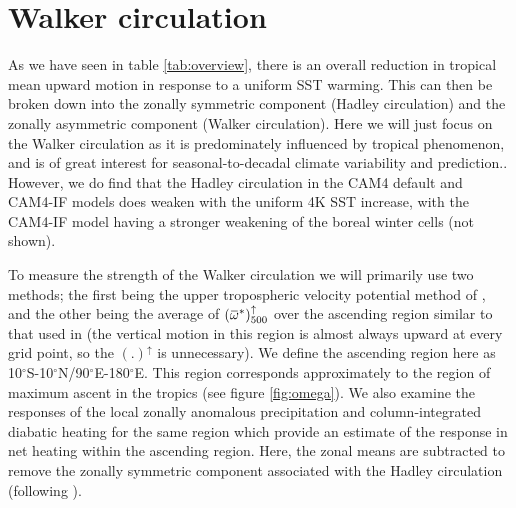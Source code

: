 \documentclass[letterpaper,12pt,titlepage,oneside,final]{book}
\newcommand{\overbar}[1]{\mkern 1.5mu\overline{\mkern-1.5mu#1\mkern-1.5mu}\mkern 1.5mu}
\begin{document}
\section{Walker circulation} 

As we have seen in table \ref{tab:overview}, there is an overall reduction in tropical mean upward motion in response to a uniform SST warming. This can then be broken down into the zonally symmetric component (Hadley circulation) and the zonally asymmetric component (Walker circulation). Here we will just focus on the Walker circulation as it is predominately influenced by tropical phenomenon, and is of great interest for seasonal-to-decadal climate variability and prediction.. However, we do find that the Hadley circulation in the CAM4 default and CAM4-IF models does weaken with the uniform 4K SST increase, with the CAM4-IF model having a stronger weakening of the boreal winter cells (not shown).

To measure the strength of the Walker circulation we will primarily use two methods; the first being the upper tropospheric velocity potential method of \citep{tanaka_trend_2004}, and the other being the average of $(\overbar{\omega}^{*})_{500}^{\uparrow}$ over the ascending region similar to that used in \citep{wills_local_2017} (the vertical motion in this region is almost always upward at every grid point, so the $(.)^{\uparrow}$ is unnecessary). We define the ascending region here as 10$^{\circ}$S-10$^{\circ}$N/90$^{\circ}$E-180$^{\circ}$E. This region corresponds approximately to the region of maximum ascent in the tropics (see figure \ref{fig:omega}). We also examine the responses of the local zonally anomalous precipitation and column-integrated diabatic heating for the same region which provide an estimate of the response in net heating within the ascending region. Here, the zonal means are subtracted to remove the zonally symmetric component associated with the Hadley circulation (following \cite{wills_local_2017}).
\end{document}

